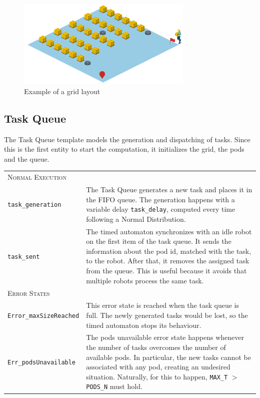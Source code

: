 \begin{figure}
    \centering
    \includegraphics[width=0.75\textwidth]{resources/grid10x10.png}
    \caption{Example of a grid layout}
    \label{fig:grid10x10}
\end{figure}

\subsection{Task Queue}
The Task Queue template models the generation and dispatching of tasks. Since this is the first entity to start the computation, it initializes the grid, the pods and the queue. 

\begin{tabularx}{\textwidth}{lX}
\multicolumn{2}{l}{{\scshape Normal Execution}}
 \vspace{0,2cm}\\
\texttt{task\_generation} & The Task Queue generates a new task and places it in the FIFO queue. The generation happens with a variable delay \texttt{task\_delay}, computed every time following a Normal Distribution. \vspace{0,2cm}\\
\texttt{task\_sent} & The timed automaton synchronizes with an idle robot on the first item of the task queue. It sends the information about the pod id, matched with the task, to the robot. After that, it removes the assigned task from the queue. This is useful because it avoids that multiple robots process the same task. \vspace{0,4cm}\\
\multicolumn{2}{l}{{\scshape Error States}} \vspace{0,2cm}\\
\texttt{Error\_maxSizeReached}  & This error state is reached when the task queue is full. The newly generated tasks would be lost, so the timed automaton stops its behaviour. \vspace{0,2cm}\\
\texttt{Err\_podsUnavailable}   & The pods unavailable error state happens whenever the number of tasks overcomes the number of available pods. In particular, the new tasks cannot be associated with any pod, creating an undesired situation. Naturally, for this to happen, \texttt{MAX\_T} $>$ \texttt{PODS\_N} must hold. \vspace{0,2cm}\\
\end{tabularx}

